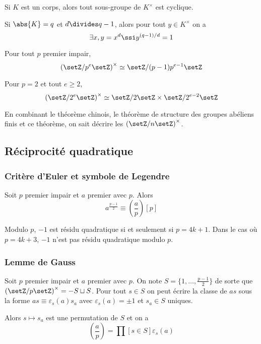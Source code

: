 \documentclass[a4paper,11pt,twocolumn]{article}\usepackage[landscape]{geometry}
\begin{document}
     Si $K$ est un corps, alors tout sous-groupe de $K^\times$ est cyclique.

     Si $\abs{K}=q$ et $d\divides q-1$, alors pour tout $y\in K^\times$ on a
    \[\exists x, y = x^d \ssi y^{(q-1)/d} = 1\]

     Pour tout $p$ premier impair,
    \[\left(\setZ/p^e\setZ\right)^\times\simeq\setZ/(p-1)p^{e-1}\setZ\]

    Pour $p=2$ et tout $e\geq2$,
    \[\left(\setZ/2^e\setZ\right)^\times\simeq\setZ/2\setZ\times\setZ/2^{e-2}\setZ\]

    En combinant le théorème chinois, le théorème de structure des groupes abéliens finis et ce théorème, on sait décrire les $\left(\setZ/n\setZ\right)^\times$.


  \subsection{Réciprocité quadratique}

    \subsubsection{Critère d'Euler et symbole de Legendre}

       \cite[prop 1.5 p.~3]{mat552} Soit $p$ premier impair et $a$ premier avec $p$. Alors
      \[a^{\frac{p-1}2} \equiv \left(\frac{a}{p}\right) [p]\]

       Modulo $p$, $-1$ est résidu quadratique si et seulement si $p=4k+1$. Dans le cas où $p=4k+3$, $-1$ n'est pas résidu quadratique modulo $p$.

    \subsubsection{Lemme de Gauss}

       Soit $p$ premier impair et $a$ premier avec $p$. On note $S=\{1,\ldots,\frac{p-1}2\}$ de sorte que $\left(\setZ/p\setZ\right)^\times=-S\sqcup S$. Pour tout $s\in S$ on peut écrire la classe de $as$ sous la forme $as\equiv\varepsilon_s(a)s_a$ avec $\varepsilon_s(a)=\pm1$ et $s_a\in S$ uniques.

      Alors $s\mapsto s_a$ est une permutation de $S$ et on a
      \[\left(\frac{a}{p}\right) = \prod[s\in S]{\varepsilon_s(a)}\]
\end{document}
